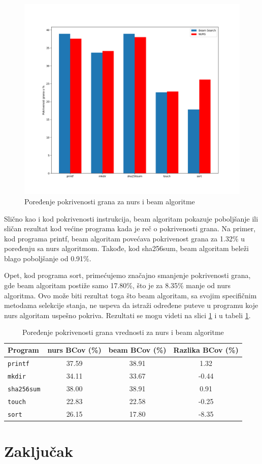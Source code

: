 \documentclass[a4paper]{article}
\begin{document}
\begin{figure}[h!]
    \centering
    \includegraphics[width=\linewidth]{ilustracije/BCov.png}
    \caption{Poređenje pokrivenosti grana za nurs i beam algoritme}
    \label{fig:bcov_comparison}
\end{figure}

Slično kao i kod pokrivenosti instrukcija, beam algoritam pokazuje poboljšanje ili sličan rezultat kod većine programa kada je reč o pokrivenosti grana. Na primer, kod programa printf, beam algoritam povećava pokrivenost grana za 1.32\% u poređenju sa nurs algoritmom. Takođe, kod sha256sum, beam algoritam beleži blago poboljšanje od 0.91\%.

Opet, kod programa sort, primećujemo značajno smanjenje pokrivenosti grana, gde beam algoritam postiže samo 17.80\%, što je za 8.35\% manje od nurs algoritma. Ovo može biti rezultat toga što beam algoritam, sa svojim specifičnim metodama selekcije stanja, ne uspeva da istraži određene puteve u programu koje nurs algoritam uspešno pokriva. Rezultati se mogu videti na slici \ref{fig:bcov_comparison} i u tabeli \ref{tab:bcov_comparison}.


\begin{table}[h!]
\centering
\begin{tabular}{|l|c|c|c|}
\hline
\textbf{Program} & \textbf{nurs BCov (\%)} & \textbf{beam BCov (\%)} & \textbf{Razlika BCov (\%)} \\ \hline
\texttt{printf} & 37.59 & 38.91 & 1.32 \\ \hline
\texttt{mkdir} & 34.11 & 33.67 & -0.44 \\ \hline
\texttt{sha256sum} & 38.00 & 38.91 & 0.91 \\ \hline
\texttt{touch} & 22.83 & 22.58 & -0.25 \\ \hline
\texttt{sort} & 26.15 & 17.80 & -8.35 \\ \hline
\end{tabular}
\caption{Poređenje pokrivenosti grana vrednosti za nurs i beam algoritme}
\label{tab:bcov_comparison}
\end{table}

\section{Zaključak}

\appendix
 

\end{document}
